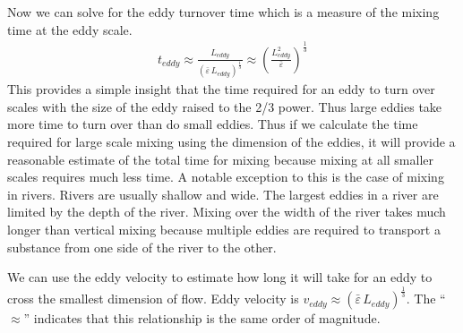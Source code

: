 \documentclass[letterpaper,10pt,english]{sphinxmanual}
\begin{document}
Now we can solve for the eddy turnover time which is a measure of the mixing time at the eddy scale.
\begin{equation}\label{equation:Rapid_Mix/RM_Derivations:Rapid_Mix/RM_Derivations:39}
\begin{split}t_{eddy} \approx \frac{L_{eddy}}{\left( \bar\varepsilon \, L_{eddy} \right)^\frac{1}{3}} \approx \left( \frac{L_{eddy}^2}{ \bar\varepsilon }\right)^\frac{1}{3}\end{split}
\end{equation}
This provides a simple insight that the time required for an eddy to turn over scales with the size of the eddy raised to the 2/3 power. Thus large eddies take more time to turn over than do small eddies. Thus if we calculate the time required for large scale mixing using the dimension of the eddies, it will provide a reasonable estimate of the total time for mixing because mixing at all smaller scales requires much less time. A notable exception to this is the case of mixing in rivers. Rivers are usually shallow and wide. The largest eddies in a river are limited by the depth of the river. Mixing over the width of the river takes much longer than vertical mixing because multiple eddies are required to transport a substance from one side of the river to the other.

We can use the eddy velocity to estimate how long it will take for an eddy to cross the smallest dimension of flow. Eddy velocity is \(v_{eddy} \approx \left( \bar\varepsilon \, L_{eddy} \right)^\frac{1}{3}\).
The “\(\approx\)” indicates that this relationship is the same order of magnitude.
\end{document}
